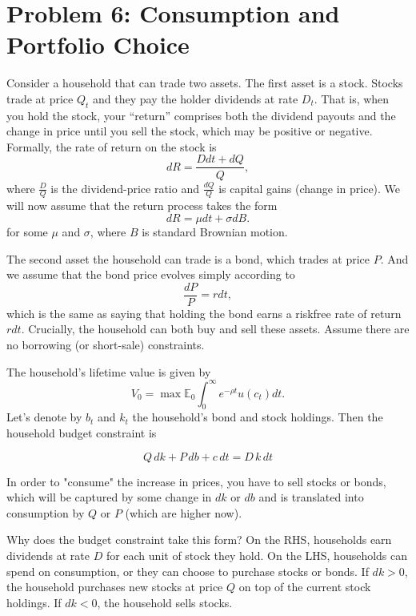 \documentclass[11pt]{extarticle}
\theoremstyle{plain}
\theoremstyle{definition}
\begin{document}
\vspace{5mm}
\section*{Problem 6: Consumption and Portfolio Choice}

Consider a household that can trade two assets. The first asset is a stock. Stocks trade at price $Q_t$ and they pay the holder dividends at rate $D_t$. That is, when you hold the stock, your ``return'' comprises both the dividend payouts and the change in price until you sell the stock, which may be positive or negative. Formally, the rate of return on the stock is 
\begin{equation*}
	dR = \frac{D dt + dQ}{Q}, 
\end{equation*}
where $\frac{D}{Q}$ is the dividend-price ratio and $\frac{dQ}{Q}$ is capital gains (change in price). We will now assume that the return process takes the form  
\begin{equation*}
	d R = \mu dt + \sigma dB.
\end{equation*}
for some $\mu$ and $\sigma$, where $B$ is standard Brownian motion. 


The second asset the household can trade is a bond, which trades at price $P$. And we assume that the bond price evolves simply according to 
\begin{equation*}
	\frac{dP}{P} = r dt,
\end{equation*}
which is the same as saying that holding the bond earns a riskfree rate of return $r dt$. Crucially, the household can both buy and sell these assets. Assume there are no borrowing (or short-sale) constraints. 

The household's lifetime value is given by
\begin{equation*}
	V_0 = \max \mathbb E_0 \int_0^\infty e^{- \rho t} u(c_t) dt.
\end{equation*}
Let's denote by $b_t$ and $k_t$ the household's bond and stock holdings. Then the household budget constraint is 

\begin{equation*}
    Q \, dk + P \, db + c \, dt = D \, k \, dt
\end{equation*}

\begin{tcolorbox}[colback=gray!10, colframe=gray!80, title=Added explanation]
    In order to "consume" the increase in prices, you have to sell stocks or bonds,
    which will be captured by some change in \( dk \) or \( db \) and is translated 
    into consumption by \( Q \) or \( P \) (which are higher now).
\end{tcolorbox}
Why does the budget constraint take this form? On the RHS, households earn dividends at rate $D$ for each unit of stock they hold. On the LHS, households can spend on consumption, or they can choose to purchase stocks or bonds. If $dk > 0$, the household purchases new stocks at price $Q$ on top of the current stock holdings. If $dk < 0$, the household sells stocks. 
\end{document}
